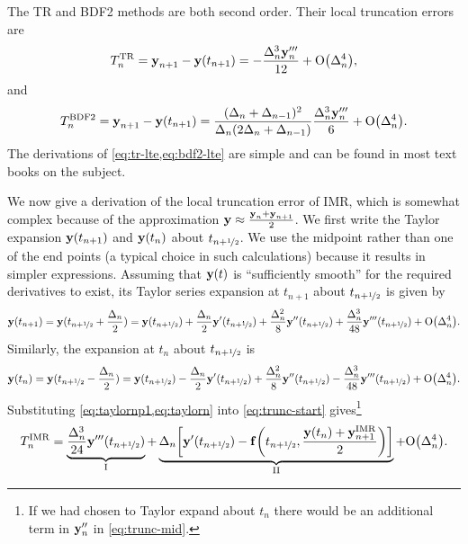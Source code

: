 The TR and BDF2 methods are both second order.
Their local truncation errors are \cite[261]{GreshoSani}
\begin{equation}
  \label{eq:tr-lte}
  \lte^\tr = \yv_{n+1} - \yv(t_{n+1}) = -\frac{\dtn^3 \yv_n'''}{12}
  + \order{\dtn^4},
\end{equation}
and \cite[715]{GreshoSani}
\begin{equation}
  \label{eq:bdf2-lte}
  \lte^\bdf = \yv_{n+1} - \yv(t_{n+1}) = \frac{(\dtn + \dtx{n-1})^2}{\dtn(2\dtn + \dtx{n-1})}
  \frac{\dtn^3 \yv_n'''}{6}
  + \order{\dtn^4}.
\end{equation}
The derivations of \cref{eq:tr-lte,eq:bdf2-lte} are simple and can be found in most text books on the subject.

We now give a derivation of the local truncation error of IMR, which is somewhat complex because of the approximation $\boldsymbol{\mathrm{y}} \approx \frac{\boldsymbol{\mathrm{y}}_n + \boldsymbol{\mathrm{y}}_{n+1}}{2}$.
We first write the Taylor expansion $\boldsymbol{\mathrm{y}}(t_{n+1})$ and $\boldsymbol{\mathrm{y}}(t_{n})$ about $t_{n+\nicefrac{1}{2}}$.
We use the midpoint rather than one of the end points (a typical choice in such calculations) because it results in simpler expressions.
Assuming that $\boldsymbol{\mathrm{y}}(t)$ is ``sufficiently smooth'' for the required derivatives to exist, its Taylor series expansion at $t_{n+1}$ about $t_{n+\nicefrac{1}{2}}$ is given by
\begin{equation}
  \yv(t_{n+1}) = \yv(\thf + \frac{\dtn}{2}) = \yvhf + \frac{\dtn}{2} \yvhf[']
  + \frac{\dtn^2}{8} \yvhf['']
  + \frac{\dtn^3}{48} \yvhf[''']
  + \order{\dtn^4}.
  \label{eq:taylornp1}
\end{equation}
Similarly, the expansion at $t_n$ about $t_{n+\nicefrac{1}{2}}$ is
\begin{equation}
  \yv(t_n) = \yv(\thf - \frac{\dtn}{2}) = \yvhf - \frac{\dtn}{2} \yvhf[']
  + \frac{\dtn^2}{8} \yvhf['']
  - \frac{\dtn^3}{48} \yvhf[''']
  + \order{\dtn^4}.
  \label{eq:taylorn}
\end{equation}
Substituting \cref{eq:taylornp1,eq:taylorn} into \cref{eq:trunc-start} gives\footnote{If we had chosen to Taylor expand about $t_n$ there would be an additional term in $\boldsymbol{\mathrm{y}}_n''$ in \cref{eq:trunc-mid}.}
\begin{equation}
  \lte^\imr = \underbrace{\frac{\dtn^3}{24} \yvhf[''']}_{\text{I}}
  + \underbrace{\dtn\bigs{ \yvhf['] - \ffv{\thf, \frac{\yv(t_n) + \yv_{n+1}^\imr}{2}} }}_{\text{II}}
  + \order{\dtn^4}.
  \label{eq:trunc-mid}
\end{equation}

